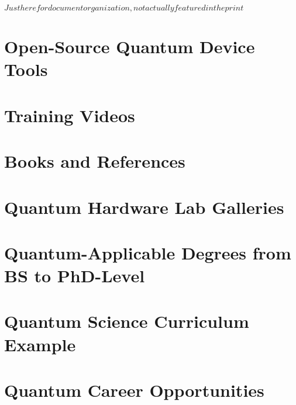 $ Just here for document organization, not actually featured in the print $


\chapter{Open-Source Quantum Device Tools}
\chapter{Training Videos}
\chapter{Books and References}
\chapter{Quantum Hardware Lab Galleries}
\chapter{Quantum-Applicable Degrees from BS to PhD-Level}
\chapter{Quantum Science Curriculum Example}
\chapter{Quantum Career Opportunities}